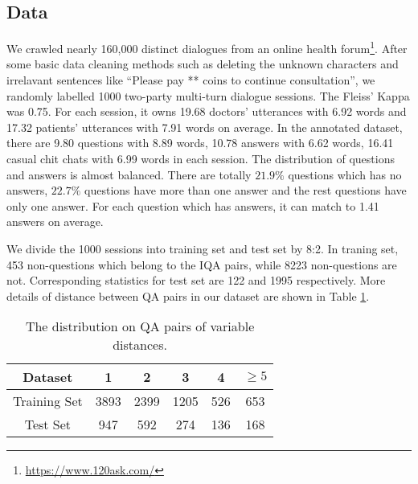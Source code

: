 \subsection{Data}
We crawled nearly 160,000 distinct dialogues from an online health forum\footnote{\url{https://www.120ask.com/}}. After some basic data cleaning methods such as deleting the unknown characters and irrelavant sentences like ``Please pay ** coins to continue consultation'', we randomly labelled 1000 two-party multi-turn dialogue sessions. The Fleiss' Kappa was 0.75. For each session, it owns 19.68 doctors' utterances with 6.92 words and 17.32 patients' utterances with 7.91 words on average. In the annotated dataset, there are 9.80 questions with 8.89 words, 10.78 answers with 6.62 words, 16.41 casual chit chats with 6.99 words in each session. The distribution of questions and answers is almost balanced. There are totally $21.9\%$ questions which has no answers, $22.7\%$ questions have more than one answer and the rest questions have only one answer. For each question which has answers, it can match to 1.41 answers on average. 

We divide the 1000 sessions into training set and test set by 8:2. In traning set, 453 non-questions which belong to the IQA pairs, while 8223 non-questions are not. Corresponding statistics for test set are 122 and 1995 respectively. More details of distance between QA pairs in our dataset are shown in Table \ref{tab:dataInfo}.

\begin{table}[h]
	\small
    \centering
    \begin{tabular}{cccccc}
    \toprule[1.2pt]
    Dataset & 1 & 2 & 3 & 4 & $\geq5$ \\
    \midrule[1pt]
    Training Set & 3893 & 2399 & 1205 & 526 & 653\\
    \hline
    Test Set & 947 & 592 & 274 & 136 & 168 \\
    \bottomrule[1.2pt]
    \end{tabular}
    \caption{The distribution on QA pairs of variable distances.}
    \label{tab:dataInfo}
\end{table}


